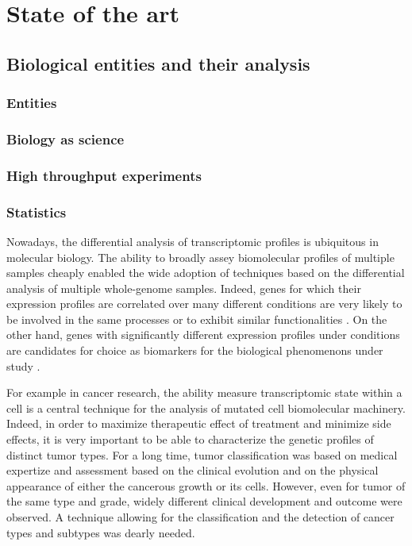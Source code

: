 \chapter{State of the art}
\label{chap:state}


\section{Biological entities and their analysis}

\subsection{Entities}

\subsection{Biology as science}

\subsection{High throughput experiments}

\subsection{Statistics}

	Nowadays, the differential analysis of transcriptomic profiles is ubiquitous in molecular biology.
	The ability to broadly assey biomolecular profiles of multiple samples cheaply enabled the wide adoption of techniques based on the differential analysis of multiple whole-genome samples.
	Indeed, genes for which their expression profiles are correlated over many different conditions are very likely to be involved in the same processes or to exhibit similar functionalities \parencite{ideker2002discovering}.
	On the other hand, genes with significantly different expression profiles under conditions are candidates for choice as biomarkers for the biological phenomenons under study \parencite{altman2001whole}.

	For example in cancer research, the ability measure transcriptomic state within a cell is a central technique for the analysis of mutated cell biomolecular machinery.
	Indeed, in order to maximize therapeutic effect of treatment and minimize side effects, it is very important to be able to characterize the genetic profiles of distinct tumor types.
	For a long time, tumor classification was based on medical expertize and assessment based on the clinical evolution and on the physical appearance of either the cancerous growth or its cells.
	However, even for tumor of the same type and grade, widely different clinical development and outcome were observed.
	A technique allowing for the classification and the detection of cancer types and subtypes was dearly needed.

